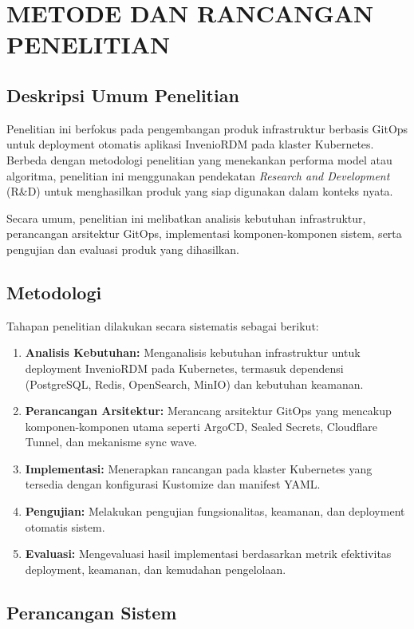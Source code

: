 \chapter{METODE DAN RANCANGAN PENELITIAN}

\section{Deskripsi Umum Penelitian}

Penelitian ini berfokus pada pengembangan produk infrastruktur berbasis GitOps untuk deployment otomatis aplikasi InvenioRDM pada klaster Kubernetes. Berbeda dengan metodologi penelitian yang menekankan performa model atau algoritma, penelitian ini menggunakan pendekatan \textit{Research and Development} (R\&D) untuk menghasilkan produk yang siap digunakan dalam konteks nyata.

Secara umum, penelitian ini melibatkan analisis kebutuhan infrastruktur, perancangan arsitektur GitOps, implementasi komponen-komponen sistem, serta pengujian dan evaluasi produk yang dihasilkan.

\section{Metodologi}

Tahapan penelitian dilakukan secara sistematis sebagai berikut:

\begin{enumerate}
    \item \textbf{Analisis Kebutuhan:} Menganalisis kebutuhan infrastruktur untuk deployment InvenioRDM pada Kubernetes, termasuk dependensi (PostgreSQL, Redis, OpenSearch, MinIO) dan kebutuhan keamanan.
    \item \textbf{Perancangan Arsitektur:} Merancang arsitektur GitOps yang mencakup komponen-komponen utama seperti ArgoCD, Sealed Secrets, Cloudflare Tunnel, dan mekanisme sync wave.
    \item \textbf{Implementasi:} Menerapkan rancangan pada klaster Kubernetes yang tersedia dengan konfigurasi Kustomize dan manifest YAML.
    \item \textbf{Pengujian:} Melakukan pengujian fungsionalitas, keamanan, dan deployment otomatis sistem.
    \item \textbf{Evaluasi:} Mengevaluasi hasil implementasi berdasarkan metrik efektivitas deployment, keamanan, dan kemudahan pengelolaan.
\end{enumerate}

\section{Perancangan Sistem}

